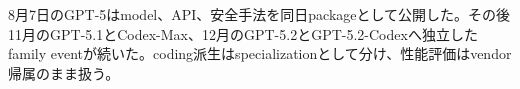 
8月7日のGPT-5はmodel、API、安全手法を同日packageとして公開した。その後11月のGPT-5.1とCodex-Max、12月のGPT-5.2とGPT-5.2-Codexへ独立したfamily eventが続いた。coding派生はspecializationとして分け、性能評価はvendor帰属のまま扱う。\autocite{src-05738f6c55b7,src-10ab1c39be14,src-55da04f42e32,src-5bea303cfdb1,src-964121647555,src-aec54e92a7f3,src-cd8d6c8023f2}
